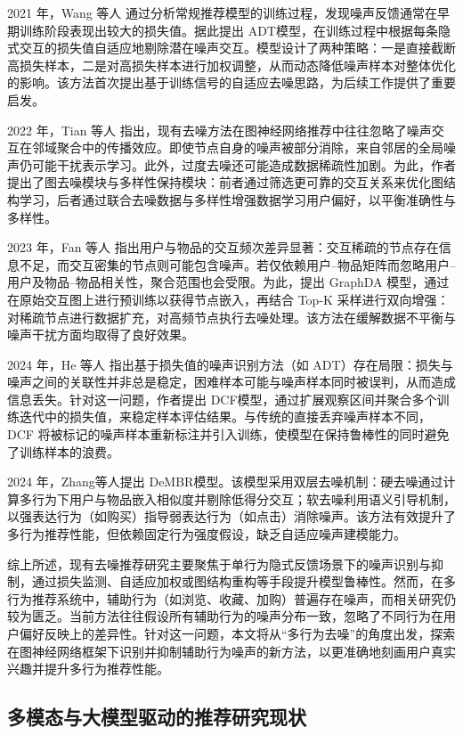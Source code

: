 2021 年，Wang 等人\cite{wang2021ADT} 通过分析常规推荐模型的训练过程，发现噪声反馈通常在早期训练阶段表现出较大的损失值。据此提出 ADT模型，在训练过程中根据每条隐式交互的损失值自适应地剔除潜在噪声交互。模型设计了两种策略：一是直接截断高损失样本，二是对高损失样本进行加权调整，从而动态降低噪声样本对整体优化的影响。该方法首次提出基于训练信号的自适应去噪思路，为后续工作提供了重要启发。

2022 年，Tian 等人\cite{tian2022learning-to-denoising} 指出，现有去噪方法在图神经网络推荐中往往忽略了噪声交互在邻域聚合中的传播效应。即使节点自身的噪声被部分消除，来自邻居的全局噪声仍可能干扰表示学习。此外，过度去噪还可能造成数据稀疏性加剧。为此，作者提出了图去噪模块与多样性保持模块：前者通过筛选更可靠的交互关系来优化图结构学习，后者通过联合去噪数据与多样性增强数据学习用户偏好，以平衡准确性与多样性。

2023 年，Fan 等人\cite{fan2023graphDA} 指出用户与物品的交互频次差异显著：交互稀疏的节点存在信息不足，而交互密集的节点则可能包含噪声。若仅依赖用户–物品矩阵而忽略用户–用户及物品–物品相关性，聚合范围也会受限。为此，提出 GraphDA 模型，通过在原始交互图上进行预训练以获得节点嵌入，再结合 Top-K 采样进行双向增强：对稀疏节点进行数据扩充，对高频节点执行去噪处理。该方法在缓解数据不平衡与噪声干扰方面均取得了良好效果。

2024 年，He 等人\cite{he2024double} 指出基于损失值的噪声识别方法（如 ADT）存在局限：损失与噪声之间的关联性并非总是稳定，困难样本可能与噪声样本同时被误判，从而造成信息丢失。针对这一问题，作者提出 DCF模型，通过扩展观察区间并聚合多个训练迭代中的损失值，来稳定样本评估结果。与传统的直接丢弃噪声样本不同，DCF 将被标记的噪声样本重新标注并引入训练，使模型在保持鲁棒性的同时避免了训练样本的浪费。

2024 年，Zhang等人提出 DeMBR模型\cite{zhang2025dembr}。该模型采用双层去噪机制：硬去噪通过计算多行为下用户与物品嵌入相似度并剔除低得分交互；软去噪利用语义引导机制，以强表达行为（如购买）指导弱表达行为（如点击）消除噪声。该方法有效提升了多行为推荐性能，但依赖固定行为强度假设，缺乏自适应噪声建模能力。

综上所述，现有去噪推荐研究主要聚焦于单行为隐式反馈场景下的噪声识别与抑制，通过损失监测、自适应加权或图结构重构等手段提升模型鲁棒性。然而，在多行为推荐系统中，辅助行为（如浏览、收藏、加购）普遍存在噪声，而相关研究仍较为匮乏。当前方法往往假设所有辅助行为的噪声分布一致，忽略了不同行为在用户偏好反映上的差异性。针对这一问题，本文将从“多行为去噪”的角度出发，探索在图神经网络框架下识别并抑制辅助行为噪声的新方法，以更准确地刻画用户真实兴趣并提升多行为推荐性能。

\subsection{多模态与大模型驱动的推荐研究现状}

